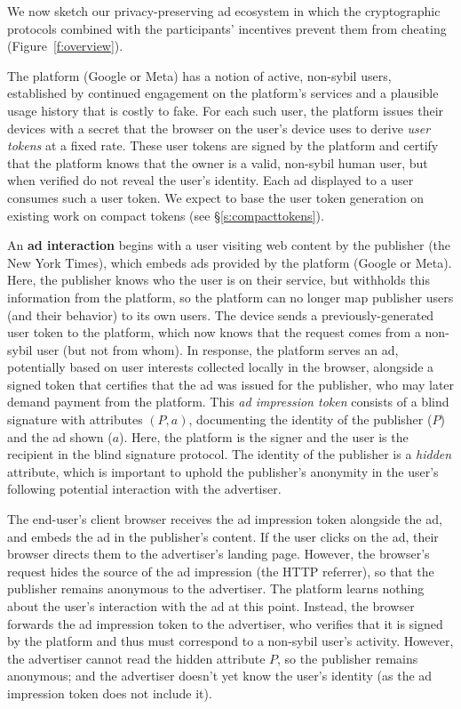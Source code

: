 %
We now sketch our privacy-preserving ad ecosystem in which the cryptographic protocols combined with the participants' incentives prevent them from cheating (Figure~\ref{f:overview}).
%

%
The platform (\eg Google or Meta) has a notion of active, non-sybil users, established \eg by continued engagement on the platform's services and a plausible usage history that is costly to fake.
%
For each such user, the platform issues their devices with a secret that the browser on the user's device uses to derive \emph{user tokens} at a fixed rate.
%
These user tokens are signed by the platform and certify that the platform knows that the owner is a valid, non-sybil human user, but when verified do not reveal the user's identity.
%
Each ad displayed to a user consumes such a user token.
%
We expect to base the user token generation on existing work on compact tokens (see \S\ref{s:compacttokens}).
%

%
An \textbf{ad interaction} begins with a user visiting web content by the publisher (\eg the New York Times), which embeds ads provided by the platform (\eg Google or Meta).
%
Here, the publisher knows who the user is on their service, but withholds this information from the platform, so the platform can no longer map publisher users (and their behavior) to its own users.
%
The device sends a previously-generated user token to the platform, which now knows that the request comes from a non-sybil user (but not from whom).
%
In response, the platform serves an ad, potentially based on user interests collected locally in the browser, alongside a signed token that certifies that the ad was issued for the publisher, who may later demand payment from the platform.
%
This \emph{ad impression token} consists of a blind signature with attributes $(P, a)$, documenting the identity of the publisher ($P$) and the ad shown ($a$).
%
Here, the platform is the signer and the user is the recipient in the blind signature protocol.
%
The identity of the publisher is a \emph{hidden} attribute, which is important to uphold the publisher's anonymity in the user's following potential interaction with the advertiser.
%

%
The end-user's client browser receives the ad impression token alongside the ad, and embeds the ad in the publisher's content.
%
If the user clicks on the ad, their browser directs them to the advertiser's landing page.
%
However, the browser's request hides the source of the ad impression (\eg the HTTP referrer), so that the publisher remains anonymous to the advertiser.
%
The platform learns nothing about the user's interaction with the ad at this point.
%
Instead, the browser forwards the ad impression token to the advertiser, who verifies that it is signed by the platform and thus must correspond to a non-sybil user's activity.
%
However, the advertiser cannot read the hidden attribute $P$, so the publisher remains anonymous; and the advertiser doesn't yet know the user's identity (as the ad impression token does not include it).
%

